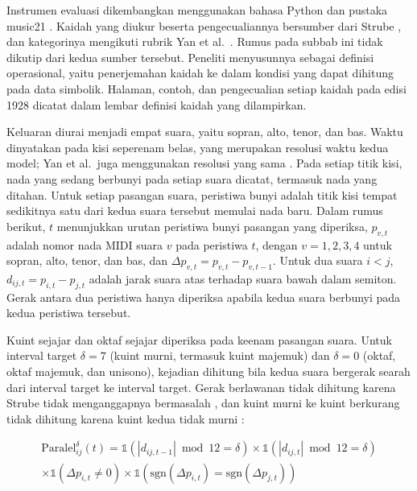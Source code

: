 Instrumen evaluasi dikembangkan menggunakan bahasa Python dan pustaka music21 \parencite{cuthbert2010}. Kaidah yang diukur beserta pengecualiannya bersumber dari Strube \parencite{strube1928}, dan kategorinya mengikuti rubrik Yan et al.\ \parencite{yan2018}. Rumus pada subbab ini tidak dikutip dari kedua sumber tersebut. Peneliti menyusunnya sebagai definisi operasional, yaitu penerjemahan kaidah ke dalam kondisi yang dapat dihitung pada data simbolik. Halaman, contoh, dan pengecualian setiap kaidah pada edisi 1928 dicatat dalam lembar definisi kaidah yang dilampirkan.

Keluaran diurai menjadi empat suara, yaitu sopran, alto, tenor, dan bas. Waktu dinyatakan pada kisi seperenam belas, yang merupakan resolusi waktu kedua model; Yan et al.\ juga menggunakan resolusi yang sama \parencite{yan2018}. Pada setiap titik kisi, nada yang sedang berbunyi pada setiap suara dicatat, termasuk nada yang ditahan. Untuk setiap pasangan suara, peristiwa bunyi adalah titik kisi tempat sedikitnya satu dari kedua suara tersebut memulai nada baru. Dalam rumus berikut, $t$ menunjukkan urutan peristiwa bunyi pasangan yang diperiksa, $p_{v,t}$ adalah nomor nada MIDI suara $v$ pada peristiwa $t$, dengan $v = 1, 2, 3, 4$ untuk sopran, alto, tenor, dan bas, dan $\Delta p_{v,t} = p_{v,t} - p_{v,t-1}$. Untuk dua suara $i < j$, $d_{ij,t} = p_{i,t} - p_{j,t}$ adalah jarak suara atas terhadap suara bawah dalam semiton. Gerak antara dua peristiwa hanya diperiksa apabila kedua suara berbunyi pada kedua peristiwa tersebut.

Kuint sejajar dan oktaf sejajar diperiksa pada keenam pasangan suara. Untuk interval target $\delta = 7$ (kuint murni, termasuk kuint majemuk) dan $\delta = 0$ (oktaf, oktaf majemuk, dan unisono), kejadian dihitung bila kedua suara bergerak searah dari interval target ke interval target. Gerak berlawanan tidak dihitung karena Strube tidak menganggapnya bermasalah \parencite[9]{strube1928}, dan kuint murni ke kuint berkurang tidak dihitung karena kuint kedua tidak murni \parencite[35]{strube1928}:

{\small
\begin{multline}
\text{Paralel}_{ij}^{\delta}(t) = \mathds{1}\left(|d_{ij,t-1}| \bmod 12 = \delta\right) \times \mathds{1}\left(|d_{ij,t}| \bmod 12 = \delta\right) \\
\times \mathds{1}\left(\Delta p_{i,t} \neq 0\right) \times \mathds{1}\left(\text{sgn}(\Delta p_{i,t}) = \text{sgn}(\Delta p_{j,t})\right)
\end{multline}
}


